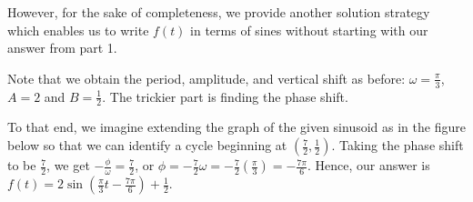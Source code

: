 \documentclass{ximera}
\begin{document}
\begin{example}
\begin{explanation}
\begin{enumerate}
However, for the sake of completeness, we provide another solution strategy which enables us to write $f(t)$ in terms of sines without starting with our answer from part 1.



Note that we obtain the period, amplitude, and vertical shift as before:   $\omega = \frac{\pi}{3}$, $A = 2$ and $B = \frac{1}{2}$.  The trickier part is finding the phase shift.  



To that end, we imagine extending the graph of the given sinusoid as in the figure below so that we can identify a cycle beginning at $\left(\frac{7}{2}, \frac{1}{2}\right)$.  Taking the phase shift to be $\frac{7}{2}$, we get $-\frac{\phi}{\omega} = \frac{7}{2}$, or $\phi = -\frac{7}{2} \omega = -\frac{7}{2}\left(\frac{\pi}{3}\right) = -\frac{7\pi}{6}$.  Hence, our answer is $f(t) = 2 \sin\left(\frac{\pi}{3} t - \frac{7\pi}{6}\right) + \frac{1}{2}$. 



\begin{image}
\end{image}
\end{enumerate}
\end{explanation}
\end{example}
\end{document}
